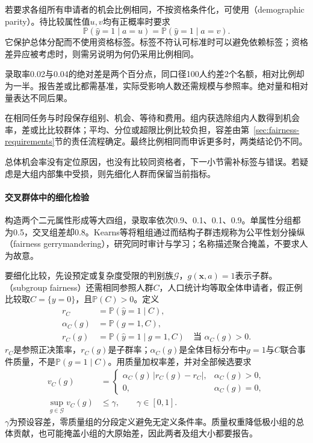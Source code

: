 若要求各组所有申请者的机会比例相同，不按资格条件化，可使用（demographic parity）。待比较属性值$u,v$均有正概率时要求
\[
 \mathbb P(\hat y=1\mid a=u)
 =\mathbb P(\hat y=1\mid a=v).
\]
它保护总体分配而不使用资格标签。标签不符认可标准时可以避免依赖标签；资格差异应被考虑时，则需另说明为何仍采用比例相同。

录取率0.02与0.04的绝对差是两个百分点，同口径100人约差2个名额，相对比例却为一半。报告差或比都需基准，实际受影响人数还需规模与参照率。绝对量和相对量表达不同后果。

在相同任务与时段保存组别、机会、等待和费用。组内获选除组内人数得到机会率，差或比比较群体；平均、分位或超限比例比较负担，容差由第~\ref{sec:fairness-requirements}节的责任流程确定。最终比例相同而申诉更多时，两类结论仍不同。

总体机会率没有定位原因，也没有比较同资格者，下一小节需补标签与错误。若疑虑是大组内部集中受损，则先细化人群而保留当前指标。

\paragraph{交叉群体中的细化检验}

构造两个二元属性形成等大四组，录取率依次0.9、0.1、0.1、0.9。单属性分组都为0.5，交叉组差却0.8。Kearns等将粗组通过而结构子群违规称为公平性划分操纵（fairness gerrymandering），研究同时审计与学习；名称描述聚合掩盖，不要求人为故意。

要细化比较，先设预定或复杂度受限的判别族$\mathcal G$，$g(\bm{x},a)=1$表示子群。（subgroup fairness）还需相同参照人群$C$，人口统计均等取全体申请者，假正例比较取$C=\{y=0\}$，且$\mathbb P(C)>0$。定义
\begin{align*}
 r_C&=\mathbb P(\hat y=1\mid C),\\
 \alpha_C(g)&=\mathbb P(g=1,C),\\
 r_C(g)&=\mathbb P(\hat y=1\mid g=1,C)
 \quad\text{当 }\alpha_C(g)>0.
\end{align*}
$r_C$是参照正决策率，$r_C(g)$是子群率；$\alpha_C(g)$是全体目标分布中$g=1$与$C$联合事件质量，不是$\mathbb P(g=1\mid C)$。用质量加权率差，并对全部候选要求
\begin{equation}
 \begin{aligned}
 v_C(g)&=
 \begin{cases}
  \alpha_C(g)\,|r_C(g)-r_C|,&\alpha_C(g)>0,\\
  0,&\alpha_C(g)=0,
 \end{cases}\\
 \sup_{g\in\mathcal G}v_C(g)&\leq\gamma,\qquad \gamma\in[0,1].
 \end{aligned}
 \label{eq:fairness-subgroup-violation}
\end{equation}
$\gamma$为预设容差，零质量组的分段定义避免无定义条件率。质量权重降低极小组的总体贡献，也可能掩盖小组的大原始差，因此两者及组大小都要报告。

